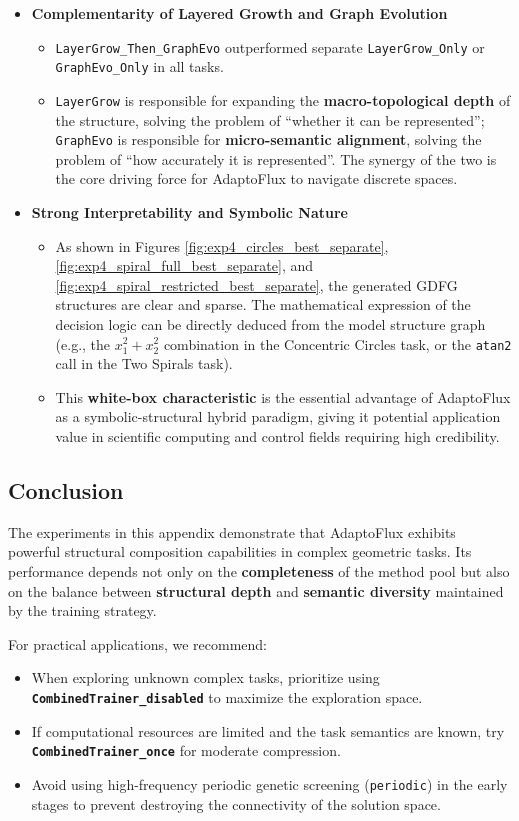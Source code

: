 \begin{itemize}
    \item \textbf{Complementarity of Layered Growth and Graph Evolution}
    \begin{itemize}
        \item \texttt{LayerGrow\_Then\_GraphEvo} outperformed separate \texttt{LayerGrow\_Only} or \texttt{GraphEvo\_Only} in all tasks.
        \item \texttt{LayerGrow} is responsible for expanding the \textbf{macro-topological depth} of the structure, solving the problem of ``whether it can be represented''; \texttt{GraphEvo} is responsible for \textbf{micro-semantic alignment}, solving the problem of ``how accurately it is represented''. The synergy of the two is the core driving force for AdaptoFlux to navigate discrete spaces.
    \end{itemize}
    
    \item \textbf{Strong Interpretability and Symbolic Nature}
    \begin{itemize}
        \item As shown in Figures \ref{fig:exp4_circles_best_separate}, \ref{fig:exp4_spiral_full_best_separate}, and \ref{fig:exp4_spiral_restricted_best_separate}, the generated GDFG structures are clear and sparse. The mathematical expression of the decision logic can be directly deduced from the model structure graph (e.g., the $x_1^2 + x_2^2$ combination in the Concentric Circles task, or the \texttt{atan2} call in the Two Spirals task).
        \item This \textbf{white-box characteristic} is the essential advantage of AdaptoFlux as a symbolic-structural hybrid paradigm, giving it potential application value in scientific computing and control fields requiring high credibility.
    \end{itemize}
\end{itemize}

\subsection{Conclusion}

The experiments in this appendix demonstrate that AdaptoFlux exhibits powerful structural composition capabilities in complex geometric tasks. Its performance depends not only on the \textbf{completeness} of the method pool but also on the balance between \textbf{structural depth} and \textbf{semantic diversity} maintained by the training strategy.

For practical applications, we recommend:
\begin{itemize}
    \item When exploring unknown complex tasks, prioritize using \textbf{\texttt{CombinedTrainer\_disabled}} to maximize the exploration space.
    \item If computational resources are limited and the task semantics are known, try \textbf{\texttt{CombinedTrainer\_once}} for moderate compression.
    \item Avoid using high-frequency periodic genetic screening (\texttt{periodic}) in the early stages to prevent destroying the connectivity of the solution space.
\end{itemize}

